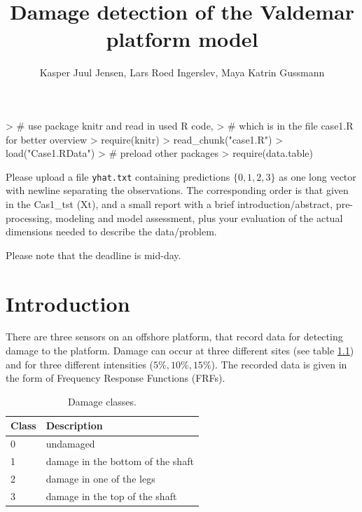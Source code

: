 \documentclass[a4paper,draft=false]{scrreprt}
\title{Damage detection of the Valdemar platform model}
\author{Kasper Juul Jensen, Lars Roed Ingerslev, Maya Katrin Gussmann}
\begin{document}
\maketitle

\begin{Schunk}
\begin{Sinput}
>   # use package knitr and read in used R code,
>   # which is in the file case1.R for better overview
>   require(knitr)
>   read_chunk("case1.R")
>   load("Case1.RData")
>   # preload other packages
>   require(data.table)
\end{Sinput}
\end{Schunk}

Please upload a file \verb+yhat.txt+ containing predictions $\lbrace 0, 1, 2, 3\rbrace$ as one long vector with newline separating the observations. The corresponding order is that given in the \mbox{Cas1\_tst} (Xt), and a small report with a brief introduction/abstract, pre-processing, modeling and model assessment, plus your evaluation of the actual dimensions needed to describe the data/problem.

Please note that the deadline is mid-day.

\chapter{Introduction}

There are three sensors on an offshore platform, that record data for detecting damage to the platform. Damage can occur at three different sites (see table \ref{table:damageclass}) and for three different intensities ($5\%, 10\%, 15\%$). The recorded data is given in the form of Frequency Response Functions (FRFs).

\begin{table}[ht]
\begin{center}
\begin{tabular}{ll}
  \hline
  Class & Description\\\hline
  0 & undamaged\\
  1 & damage in the bottom of the shaft\\
  2 & damage in one of the legs\\
  3 & damage in the top of the shaft\\
  \hline
\end{tabular}
\caption{Damage classes.\label{table:damageclass}}
\end{center}
\end{table}
\end{document}
